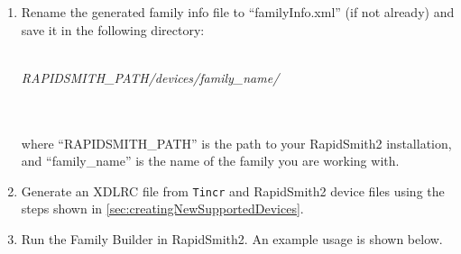 \begin {enumerate}
\begin{enumerate}
    \end{enumerate}
    
    \bigbreak \noindent
	\begin{large}
	\textbf{Other Devices}
	\end{large}
	  	
  	\noindent UltraScale and later devices require only one hand edit: adding 
  	missing compatible types (most compatible types can be determined
  	automatically). The XML listings below show the two compatible types that
  	were manually added in order to complete the Kintex UltraScale family info.

\begin{lstlisting}[numbers=none]
    <site_type>
      <name>SLICEL</name>
      <is_slice/>
      |\textbf{<compatible\_types>}|
        |\textbf{<compatible\_type>SLICEM</compatible\_type>}|
      |\textbf{</compatible\_types>}|
\end{lstlisting}  

\begin{lstlisting}[numbers=none]
    <site_type>
      <name>HRIO</name> 
      <is_iob/>
      |\textbf{<compatible\_types>}|
        |\textbf{<compatible\_type>HPIOB</compatible\_type>}|
      |\textbf{</compatible\_types>}|
\end{lstlisting} 
   
	\noindent For other device families, you may have to add additional compatible
	sites. It is up to you to determine what compatible sites need to be added
	through experimentation.
    
    \item Rename the generated family info file to ``familyInfo.xml'' (if not
    already) and save it in the following directory: \\\\
    \centerline{\textit{RAPIDSMITH\_PATH/devices/family\_name/ }}\\\\
     where ``RAPIDSMITH\_PATH'' is the
    path to your RapidSmith2 installation, and ``family\_name'' is the name of
    the family you are working with.
    	 
	\item Generate an XDLRC file from \texttt{Tincr} and RapidSmith2 device
	files using the steps shown in \autoref{sec:creatingNewSupportedDevices}.
	    
	\item Run the Family Builder in RapidSmith2. An example usage is shown below.


\end{enumerate}
